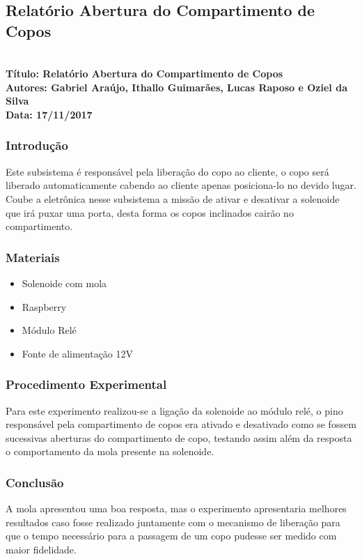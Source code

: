 \subsection{Relatório Abertura do Compartimento de Copos}     
\textbf{ \\
  Título: Relatório Abertura do Compartimento de Copos  \\
    Autores: Gabriel Araújo, Ithallo Guimarães, Lucas Raposo e Oziel da Silva \\
      Data: 17/11/2017} \\



\subsubsection{Introdução}
    Este subsistema é responsável pela liberação do copo ao cliente, o copo será liberado automaticamente cabendo ao cliente apenas posiciona-lo no devido lugar. Coube a eletrônica nesse subsistema a missão de ativar e desativar a solenoide que irá puxar uma porta, desta forma os copos inclinados cairão no compartimento.

\subsubsection{Materiais}
\begin{itemize}
     \item Solenoide com mola
     \item Raspberry
     \item Módulo Relé
     \item Fonte de alimentação 12V    
         
\end{itemize}

\subsubsection{Procedimento Experimental}
    Para este experimento realizou-se a ligação da solenoide ao módulo relé, o pino responsável pela compartimento de copos era ativado e desativado como se fossem sucessivas aberturas do compartimento de copo, testando assim além da resposta o comportamento da mola presente na solenoide.

\subsubsection{Conclusão}
    A mola apresentou uma boa resposta, mas o experimento apresentaria melhores resultados caso fosse realizado juntamente com o mecanismo de liberação para que o tempo necessário para a passagem de um copo pudesse ser medido com maior fidelidade.

